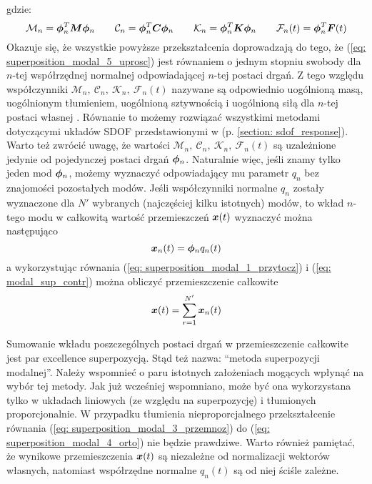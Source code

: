 gdzie:
\begin{equation} \label{eq: superposition_modal_6_podstawki}
	\mathcal{M}_n= \bm{\phi}_n^T \bm{M} \bm{\phi}_n \qquad 
	\mathcal{C}_n= \bm{\phi}_n^T \bm{C} \bm{\phi}_n \qquad 
	\mathcal{K}_n= \bm{\phi}_n^T \bm{K} \bm{\phi}_n \qquad
	\mathcal{F}_n(t)= \bm{\phi}_n^T \bm{F}(t)
\end{equation} 
Okazuje się, że wszystkie powyższe przekształcenia doprowadzają do tego, że (\ref{eq: superposition_modal_5_uprosc}) jest równaniem o jednym stopniu swobody dla $n$-tej współrzędnej normalnej odpowiadającej $n$-tej postaci drgań. Z tego względu współczynniki $\mathcal{M}_n,\:\mathcal{C}_n,\:\mathcal{K}_n,\:\mathcal{F}_n(t)$ nazywane są odpowiednio uogólnioną masą, uogólnionym tłumieniem, uogólnioną sztywnością i uogólnioną siłą dla $n$-tej postaci własnej . Równanie to możemy rozwiązać wszystkimi metodami dotyczącymi układów SDOF przedstawionymi w (p. \ref{section: sdof_response}). Warto też zwrócić uwagę, że wartości $\mathcal{M}_n,\:\mathcal{C}_n,\:\mathcal{K}_n,\:\mathcal{F}_n(t)$ są uzależnione jedynie od pojedynczej postaci drgań $\bm{\phi}_n$. Naturalnie więc, jeśli znamy tylko jeden mod $\bm{\phi}_n$, możemy wyznaczyć odpowiadający mu parametr $q_n$ bez znajomości pozostałych modów.
Jeśli współczynniki normalne $q_n$ zostały wyznaczone dla $N'$ wybranych (najczęściej kilku istotnych) modów, to wkład $n$-tego modu w całkowitą wartość przemieszczeń $\bm{x}(t)$ wyznaczyć można następująco
\begin{equation} \label{eq: modal_sup_contr}
	\bm{x}_n(t) = \bm{\phi}_n q_n(t)
\end{equation}
a wykorzystując równania (\ref{eq: superposition_modal_1_przytocz}) i (\ref{eq: modal_sup_contr}) można obliczyć przemieszczenie całkowite
\begin{equation}
		\bm{x}(t) = \sum_{r=1}^{N'} \bm{x}_n(t)
\end{equation}

Sumowanie wkładu poszczególnych postaci drgań w przemieszczenie całkowite jest par excellence superpozycją. Stąd też nazwa: \enquote{metoda superpozycji modalnej}. Należy wspomnieć o paru istotnych założeniach mogących wpłynąć na wybór tej metody. Jak już wcześniej wspomniano, może być ona wykorzystana tylko w układach liniowych (ze względu na superpozycję) i tłumionych proporcjonalnie. W przypadku tłumienia nieproporcjalnego przekształcenie równania (\ref{eq: superposition_modal_3_przemnoz}) do (\ref{eq: superposition_modal_4_orto}) nie będzie prawdziwe. Warto również pamiętać, że wynikowe przemieszczenia $\bm{x}(t)$ są niezależne od normalizacji wektorów własnych, natomiast współrzędne normalne $q_n(t)$ są od niej ściśle zależne. 


